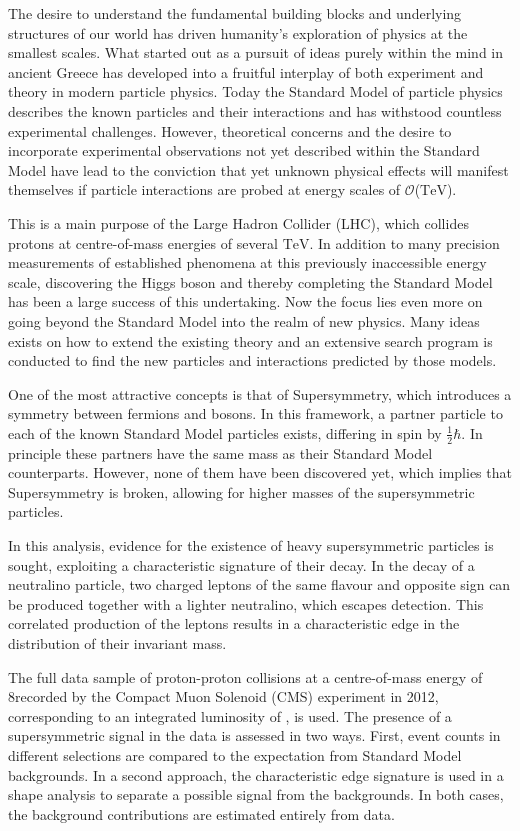The desire to understand the fundamental building blocks and underlying structures of our world has driven humanity's exploration of physics at the smallest scales. What started out as a pursuit of ideas purely within the mind in ancient Greece has developed into a fruitful interplay of both experiment and theory in modern particle physics. Today the Standard Model of particle physics describes the known particles and their interactions and has withstood countless experimental challenges. However, theoretical concerns and the desire to incorporate experimental observations not yet described within the Standard Model have lead to the conviction that yet unknown physical effects will manifest themselves if particle interactions are probed at energy scales of $\mathcal{O}$($\mathrm{TeV}$).

This is a main purpose of the Large Hadron Collider (LHC), which collides protons at centre-of-mass energies of several $\mathrm{TeV}$. In addition to many precision measurements of established phenomena at this previously inaccessible energy scale, discovering the Higgs boson and thereby completing the Standard Model has been a large success of this undertaking. Now the focus lies even more on going beyond the Standard Model into the realm of new physics. Many ideas exists on how to extend the existing theory and an extensive search program is conducted to find the new particles and interactions predicted by those models. 

One of the most attractive concepts is that of Supersymmetry, which introduces a symmetry between fermions and bosons. In this framework, a partner particle to each of the known Standard Model particles exists, differing in spin by $\frac{1}{2}\hbar$. In principle these partners have the same mass as their Standard Model counterparts. However, none of them have been discovered yet, which implies that Supersymmetry is broken, allowing for higher masses of the supersymmetric particles.

In this analysis, evidence for the existence of heavy supersymmetric particles is sought, exploiting a characteristic signature of their decay. In the decay of a neutralino particle, two charged leptons of the same flavour and opposite sign can be produced together with a lighter neutralino, which escapes detection. This correlated production of the leptons results in a characteristic edge in the distribution of their invariant mass.

The full data sample of proton-proton collisions at a centre-of-mass energy of 8\TeV recorded by the Compact Muon Solenoid (CMS) experiment in 2012, corresponding to an integrated luminosity of \lumi, is used. The presence of a supersymmetric signal in the data is assessed in two ways. First, event counts in different selections are compared to the expectation from Standard Model backgrounds. In a second approach, the characteristic edge signature is used in a shape analysis to separate a possible signal from the backgrounds. In both cases, the background contributions are estimated entirely from data. 

